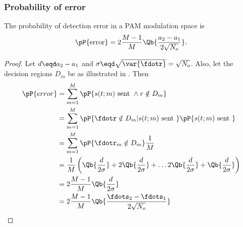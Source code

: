 \subsubsection{Probability of error}
\begin{theorem}
The probability of detection error in a PAM modulation space is
   \[ \pP{\mbox{error}} = 2\frac{M-1}{M} \Qb{\frac{a_2-a_1}{2\sqrt{N_o}}} .\]
\end{theorem}

\begin{proof}
Let $d\eqd a_2-a_1$ and $\sigma\eqd \sqrt{\var{\fdotr}}=\sqrt{N_o}$.
Also, let the decision regions $D_m$ be as illustrated in .
Then
\begin{align*}
   \pP{error}
     &= \sum_{m=1}^M \pP{s(t;m) \mbox{ sent } \land r\notin D_m}
   \\&= \sum_{m=1}^M \pP{\fdotr \notin D_m | s(t;m) \mbox{ sent } }\pP{s(t;m) \mbox{ sent }}
   \\&= \sum_{m=1}^M \pP{\fdotr_m \notin D_m } \frac{1}{M}
   \\&= \frac{1}{M}\left(
             \Qb{\frac{d}{2\sigma}} +
            2\Qb{\frac{d}{2\sigma}} +
            \ldots
            2\Qb{\frac{d}{2\sigma}} +
             \Qb{\frac{d}{2\sigma}}
         \right)
   \\&= 2\frac{M-1}{M} \Qb{\frac{d}{2\sigma}}
   \\&= 2\frac{M-1}{M} \Qb{\frac{\fdots_2-\fdots_1}{2\sqrt{N_o}}}
\end{align*}
\end{proof}




